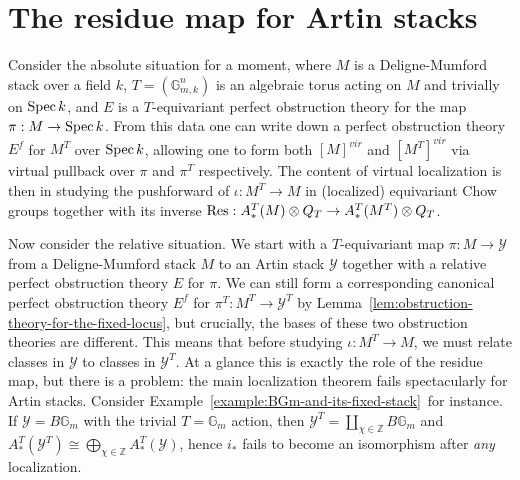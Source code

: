 \section{The residue map for Artin stacks}\label{rl-000Q}

Consider the absolute situation for a moment, where \(M\) is a Deligne-Mumford stack over a field \(k\), \(T = (\mathbb G_{m,k}^n)\) is an algebraic torus acting on \(M\) and trivially on \(\operatorname{Spec} k\), and \(E\) is a \(T\)-equivariant perfect obstruction theory for the map \(\pi:M\to \operatorname{Spec} k\). From this data one can write down a perfect obstruction theory \(E^f\) for \(M^T\) over \(\operatorname{Spec} k\), allowing one to form both \([M]^{vir}\) and \([M^T]^{vir}\) via virtual pullback over \(\pi\) and \(\pi^T\) respectively. The content of virtual localization is then in studying the pushforward of \(\iota:M^T\to M\) in (localized) equivariant Chow groups together with its inverse \(\operatorname{Res}:A^T_*(M)\otimes Q_T\to A^T_*(M^T)\otimes Q_T\).




Now consider the relative situation. We start with a \(T\)-equivariant map \(\pi:M\to \mathcal Y\) from a Deligne-Mumford stack \(M\) to an Artin stack \(\mathcal Y\) together with a relative perfect obstruction theory \(E\) for \(\pi\). We can still form a corresponding canonical perfect obstruction theory \(E^f\) for \(\pi^T:M^T\to \mathcal Y^T\) by Lemma~\ref{lem:obstruction-theory-for-the-fixed-locus}, but crucially, the bases of these two obstruction theories are different. This means that before studying \(\iota:M^T\to M\), we must relate classes in \(\mathcal Y\) to classes in \(\mathcal Y^T\). At a glance this is exactly the role of the residue map, but there is a problem: the main localization theorem fails spectacularly for Artin stacks. Consider Example~\ref{example:BGm-and-its-fixed-stack}~for instance. If \(\mathcal Y = B\mathbb G_m\) with the trivial \(T = \mathbb G_m\) action, then \(\mathcal Y^T = \coprod_{\chi\in \mathbb Z}B\mathbb G_m\) and \(A^T_*(\mathcal Y^T)\cong \bigoplus_{\chi\in \mathbb Z} A^T_*(\mathcal Y)\), hence \(i_*\) fails to become an isomorphism after \emph{any} localization.

